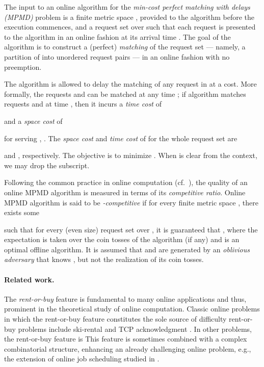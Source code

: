 \documentclass[11pt]{article}
\def\LongVersion{}
\def\LongVersionEnd{}
\def\ShortVersion{}
\def\ShortVersionEnd{}
\theoremstyle{definition}
\theoremstyle{plain}
\theoremstyle{definition}
\theoremstyle{plain}
\theoremstyle{definition}
\theoremstyle{plain}
\newcommand{\NotationLabel}[1]{\label{notationTable:#1}\ignorespaces}
\begin{document}
The input to an online algorithm for the \emph{min-cost perfect matching with
delays (MPMD)} problem is a finite metric space ,
provided to the algorithm before the execution commences, and a request set
 over  such that each request  is presented to
the algorithm in an online fashion at its arrival time
.
The goal of the algorithm is to construct a (perfect) \emph{matching} of the
request set --- namely, a partition of  into  unordered request
pairs --- in an online fashion with no preemption.

The algorithm is allowed to delay the matching of any request in  at a
cost.
More formally, the requests  and  can be matched at any time
;
if algorithm  matches requests  and  at time ,
then it incurs a \emph{time cost} of

\NotationLabel{model:time-cost-request}
and a \emph{space cost} of

\NotationLabel{model:space-cost-request}
for serving ,
.
The \emph{space cost} and \emph{time cost} of  for the whole request set
are

\NotationLabel{model:space-cost-instance}
and
,
\NotationLabel{model:time-cost-instance}
respectively.
The objective is to minimize
.
\NotationLabel{model:total-cost}
When  is clear from the context, we may drop the subscript.

Following the common practice in online computation (cf.\ \cite{BorodinE1998}),
the quality of an online MPMD algorithm is measured in terms of its
\emph{competitive ratio}.
Online MPMD algorithm  is said to be \emph{-competitive} if for
every finite metric space , there exists some

such that for every (even size) request set  over , it
is guaranteed that
,
where the expectation is taken over the coin tosses of the algorithm
(if any) and  is an optimal offline algorithm.
It is assumed that  and  are generated by an \emph{oblivious
adversary} that knows , but not the realization of its coin tosses.

\paragraph{Related work.}
The \emph{rent-or-buy} feature is fundamental to
\LongVersion many online applications and thus, prominent in the theoretical study of
\LongVersionEnd online computation.
Classic online
\LongVersion problems in which the rent-or-buy feature constitutes the
sole source of difficulty
\LongVersionEnd \ShortVersion rent-or-buy problems
\ShortVersionEnd include
ski-rental
\cite{KarlinMRS1986,KarlinMMLO1990,KarlinKR2001} and
TCP acknowledgment
\cite{DoolyGS1998,DoolyGS2001,KarlinKR2001}.
\LongVersion In other problems, the rent-or-buy feature is
\LongVersionEnd \ShortVersion This feature is sometimes
\ShortVersionEnd combined with a complex combinatorial structure, enhancing an already
challenging online problem, e.g., the extension of online job scheduling
\cite{AwerbuchKP1992,AwerbuchALR2002} studied in
\cite{AverbakhX2007,AverbakhB2013,AzarEJV2016}.
\end{document}
